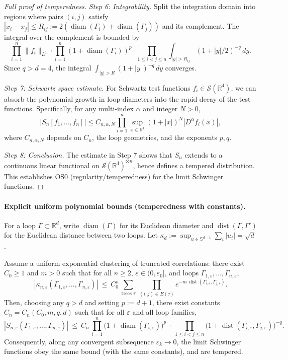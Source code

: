 \documentclass[11pt]{amsart}
\begin{document}
\begin{proof}[Full proof of temperedness]
\emph{Step 6: Integrability.} Split the integration domain into regions where pairs $(i,j)$ satisfy $|x_i - x_j| \le R_{ij} := 2(\operatorname{diam}(\Gamma_i) + \operatorname{diam}(\Gamma_j))$ and its complement. The integral over the complement is bounded by
\[
  \prod_{i=1}^n \|f_i\|_{L^1} \cdot \prod_{i=1}^n (1 + \operatorname{diam}(\Gamma_i))^p \cdot \prod_{1 \le i < j \le n} \int_{|y| > R_{ij}} (1 + |y|/2)^{-q} \, dy.
\]
Since $q > d = 4$, the integral $\int_{|y| > R} (1 + |y|)^{-q} \, dy$ converges.

\emph{Step 7: Schwartz space estimate.} For Schwartz test functions $f_i \in \mathcal{S}(\mathbb{R}^4)$, we can absorb the polynomial growth in loop diameters into the rapid decay of the test functions. Specifically, for any multi-index $\alpha$ and integer $N > 0$,
\[
  |S_n[f_1, \ldots, f_n]| \le C_{n,\alpha,N} \prod_{i=1}^n \sup_{x \in \mathbb{R}^4} (1 + |x|)^N |D^\alpha f_i(x)|,
\]
where $C_{n,\alpha,N}$ depends on $C_n$, the loop geometries, and the exponents $p, q$.

\emph{Step 8: Conclusion.} The estimate in Step 7 shows that $S_n$ extends to a continuous linear functional on $\mathcal{S}(\mathbb{R}^4)^{\otimes n}$, hence defines a tempered distribution. This establishes OS0 (regularity/temperedness) for the limit Schwinger functions.
\end{proof}

\paragraph{Explicit uniform polynomial bounds (temperedness with constants).}
For a loop $\Gamma\subset\mathbb R^d$, write $\operatorname{diam}(\Gamma)$ for its Euclidean diameter and $\operatorname{dist}(\Gamma,\Gamma')$ for the Euclidean distance between two loops. Let $\kappa_d:=\sup_{u\in\mathbb S^{d-1}}\sum_i |u_i|=\sqrt d$.

\begin{lemma}
Assume a uniform exponential clustering of truncated correlations: there exist $C_0\ge 1$ and $m>0$ such that for all $n\ge 2$, $\varepsilon\in(0,\varepsilon_0]$, and loops $\Gamma_{1,\varepsilon},\dots,\Gamma_{n,\varepsilon}$,
\[
  |\kappa_{n,\varepsilon}(\Gamma_{1,\varepsilon},\dots,\Gamma_{n,\varepsilon})|\ \le\ C_0^n\,\sum_{\text{trees }\tau}\ \prod_{(i,j)\in E(\tau)} e^{-m\,\operatorname{dist}(\Gamma_{i,\varepsilon},\Gamma_{j,\varepsilon})}.
\]
Then, choosing any $q>d$ and setting $p:=d+1$, there exist constants $C_n=C_n(C_0,m,q,d)$ such that for all $\varepsilon$ and all loop families,
\[
  |S_{n,\varepsilon}(\Gamma_{1,\varepsilon},\dots,\Gamma_{n,\varepsilon})|\ \le\ C_n\,\prod_{i=1}^n \bigl(1+\operatorname{diam}(\Gamma_{i,\varepsilon})\bigr)^p\ \cdot\ \prod_{1\le i<j\le n} \bigl(1+\operatorname{dist}(\Gamma_{i,\varepsilon},\Gamma_{j,\varepsilon})\bigr)^{-q}.
\]
Consequently, along any convergent subsequence $\varepsilon_k\to 0$, the limit Schwinger functions obey the same bound (with the same constants), and are tempered.
\end{lemma}
\end{document}
